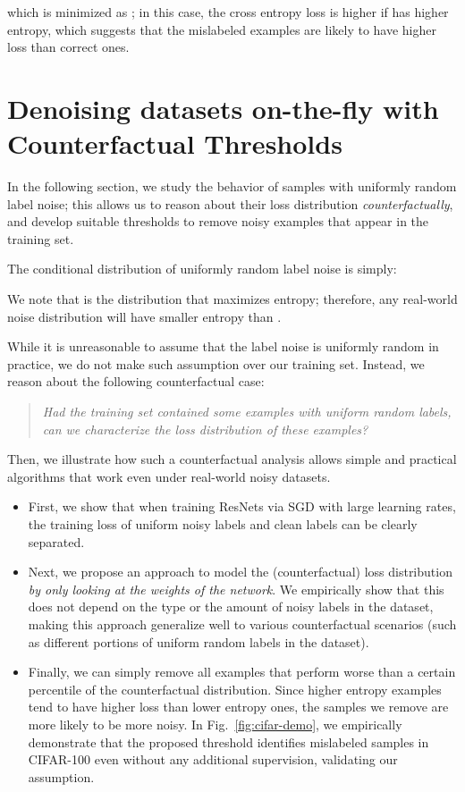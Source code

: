 \documentclass[a4paper,11pt]{article}
\begin{document}
which is minimized as ; in this case, the cross entropy loss is higher if  has higher entropy, which suggests that the mislabeled examples are likely to have higher loss than correct ones.

\section{Denoising datasets on-the-fly with Counterfactual Thresholds}
In the following section, we study the behavior of samples with uniformly random label noise; this allows us to reason about their loss distribution \textit{counterfactually}, and develop suitable thresholds to remove noisy examples that appear in the training set. 

The conditional distribution  of uniformly random label noise is simply:

We note that  is the distribution that maximizes entropy; therefore, any real-world noise distribution  will have smaller entropy than . 

While it is unreasonable to assume that the label noise is uniformly random in practice, we do not make such assumption over our training set. Instead, we reason about the following counterfactual case: 
\begin{quote}
    \textit{Had the training set contained some examples with uniform random labels, can we characterize the loss distribution of these examples?}
\end{quote}

Then, we illustrate how such a counterfactual analysis allows simple and practical algorithms that work even under real-world noisy datasets.
\begin{itemize}
    \item First, we show that when training ResNets via SGD with large learning rates, the training loss of uniform noisy labels and clean labels can be clearly separated.
    \item Next, we propose an approach to model the (counterfactual) loss distribution 
\textit{by only looking at the weights of the network}. We empirically show that this does not depend on the type or the amount of noisy labels in the dataset, making this approach generalize well to various counterfactual scenarios (such as different portions of uniform random labels in the dataset).
    \item Finally, we can simply remove all examples that perform worse than a certain percentile of the counterfactual distribution. Since higher entropy examples tend to have higher loss than lower entropy ones, the samples we remove are more likely to be more noisy. In Fig.~\ref{fig:cifar-demo}, we empirically demonstrate that the proposed threshold identifies mislabeled samples in CIFAR-100 even without any additional supervision, validating our assumption.
\end{itemize}
\end{document}
